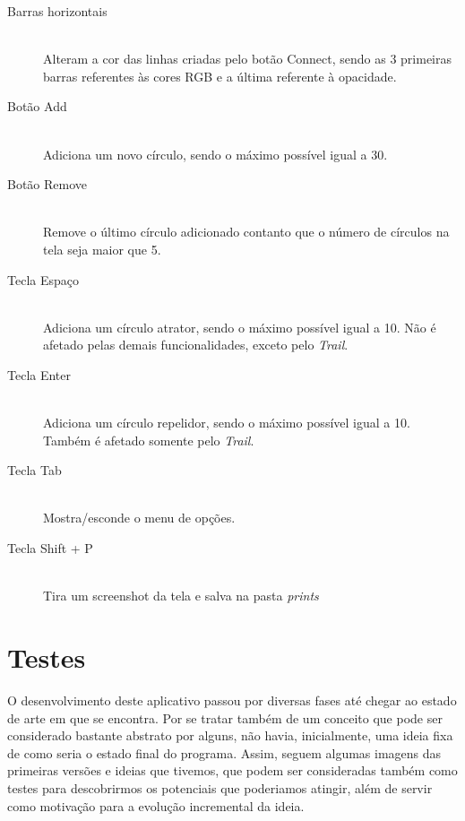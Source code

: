 \documentclass[12pt]{article}
\begin{document}
\begin{description}
\item[Barras horizontais] \hfill \\
Alteram a cor das linhas criadas pelo botão Connect, sendo as 3 primeiras barras referentes às cores RGB e a última referente à opacidade.
\vspace{0.4 true cm}

\item[Botão Add] \hfill \\
Adiciona um novo círculo, sendo o máximo possível igual a 30.
\vspace{0.4 true cm}

\item[Botão Remove] \hfill \\
Remove o último círculo adicionado contanto que o número de círculos na tela seja maior que 5.
\vspace{0.4 true cm}

\item[Tecla Espaço] \hfill \\
Adiciona um círculo atrator, sendo o máximo possível igual a 10. Não é afetado pelas demais funcionalidades, exceto pelo \textit{Trail}.
\vspace{0.4 true cm}

\item[Tecla Enter] \hfill \\
Adiciona um círculo repelidor, sendo o máximo possível igual a 10. Também é afetado somente pelo \textit{Trail}.
\vspace{0.4 true cm}

\item[Tecla Tab] \hfill \\
Mostra/esconde o menu de opções.
\vspace{0.4 true cm}

\item[Tecla Shift + P] \hfill \\
Tira um screenshot da tela e salva na pasta \textit{prints}

\end{description}

\section{Testes}
\label{testes}

O desenvolvimento deste aplicativo passou por diversas fases até chegar ao estado de arte em que se encontra. Por se tratar também de um conceito que pode ser considerado bastante abstrato por alguns, não havia, inicialmente, uma ideia fixa de como seria o estado final do programa. Assim, seguem algumas imagens das primeiras versões e ideias que tivemos, que podem ser consideradas também como testes para descobrirmos os potenciais que poderiamos atingir, além de servir como motivação para a evolução incremental da ideia.
\end{document}
